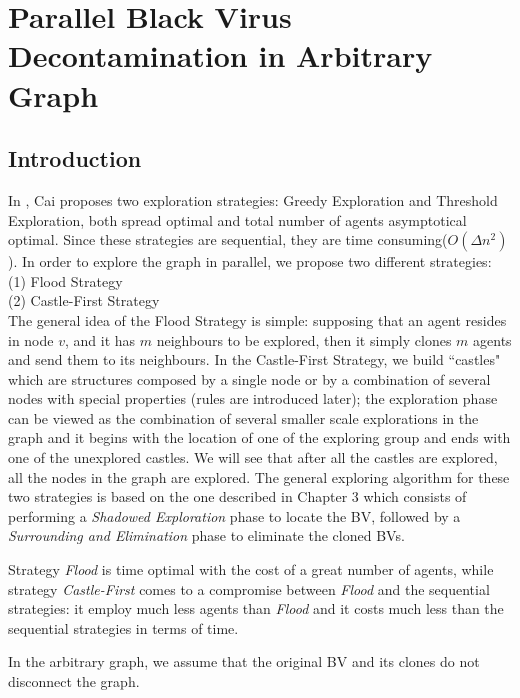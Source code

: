 \chapter {Parallel Black Virus Decontamination in Arbitrary Graph}
\label{TL}

\section{Introduction}
In \cite{cai}, Cai proposes two exploration strategies: Greedy Exploration and Threshold Exploration, both spread optimal and total number of agents asymptotical optimal. Since these strategies are sequential, they are time consuming($O(\Delta n^2)$).  In order to explore the graph in parallel, we propose two different strategies: \\
(1) Flood Strategy\\
(2) Castle-First Strategy\\
The general idea of the Flood Strategy is simple: supposing that an agent resides in node $v$, and it has $m$ neighbours  to be explored, then it simply clones $m$ agents and send them to its neighbours. In the Castle-First Strategy, we build ``castles" which are structures composed by  a single node or by a combination of several nodes with special properties (rules are introduced later); the exploration phase can be viewed as the combination of several smaller scale explorations in the graph and it begins with the location of one of the exploring group and ends with one of the unexplored castles. We will see that after all the castles are explored, all the nodes in the graph are explored. The general exploring algorithm for these two strategies is based on the one described in Chapter 3 which consists of performing a {\em Shadowed Exploration} phase to locate the BV, followed by a {\em Surrounding and Elimination} phase to eliminate the cloned BVs. 

Strategy {\em Flood}  is time optimal with the cost of a great number of agents,
 while strategy {\em Castle-First} comes to a compromise between  {\em Flood} and the sequential strategies: it employ much less agents than  {\em Flood} and it costs much less  than the sequential strategies in terms of time. 

 In the arbitrary graph, we assume that  the original BV and its clones do not disconnect the graph.

